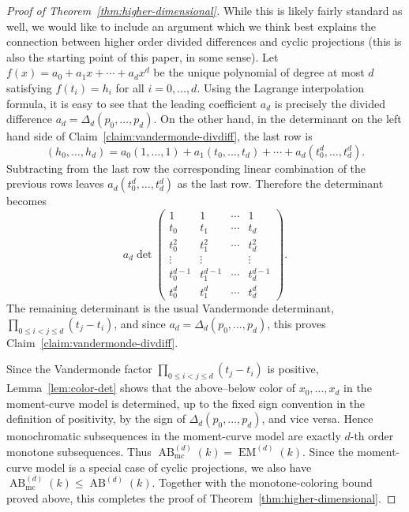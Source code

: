 \documentclass[10pt,a4paper]{amsart}
\begin{document}
\begin{proof}[Proof of Theorem~\ref{thm:higher-dimensional}]
While this is likely fairly standard as well, we would like to include an argument which we think best explains the connection between higher order divided differences and cyclic projections (this is also the starting point of this paper, in some sense). Let $f(x)=a_0+a_1x+\cdots+a_dx^d$ be the unique polynomial of degree at most $d$ satisfying $f(t_i)=h_i$ for all
$i=0,\dots,d$. Using the Lagrange interpolation formula, it is easy to see that
the leading coefficient $a_d$ is precisely the divided difference $a_d=\Delta_d(p_0,\dots,p_d)$. On the other hand, in the determinant on the left hand side of
Claim~\ref{claim:vandermonde-divdiff}, the last row is
\[
(h_0,\dots,h_d)
=
a_0(1,\dots,1)+a_1(t_0,\dots,t_d)+\cdots+a_d(t_0^d,\dots,t_d^d).
\]
Subtracting from the last row the corresponding linear combination of the
previous rows leaves $a_d(t_0^d,\dots,t_d^d)$ as the last row. Therefore the
determinant becomes
\[
a_d
\det
\begin{pmatrix}
1&1&\cdots&1\\
t_0&t_1&\cdots&t_d\\
t_0^2&t_1^2&\cdots&t_d^2\\
\vdots&\vdots&&\vdots\\
t_0^{d-1}&t_1^{d-1}&\cdots&t_d^{d-1}\\
t_0^d&t_1^d&\cdots&t_d^d
\end{pmatrix}.
\]
The remaining determinant is the usual Vandermonde determinant,
$\prod_{0\le i<j\le d}(t_j-t_i)$, and since
$a_d=\Delta_d(p_0,\dots,p_d)$, this proves Claim~\ref{claim:vandermonde-divdiff}.

Since the Vandermonde factor $\prod_{0\le i<j\le d}(t_j-t_i)$ is positive,
Lemma~\ref{lem:color-det} shows that the above--below color of
$x_0,\ldots,x_d$ in the moment-curve model is determined, up to the fixed sign
convention in the definition of positivity, by the sign of
$\Delta_d(p_0,\ldots,p_d)$, and vice versa. Hence monochromatic subsequences in
the moment-curve model are exactly $d$-th order monotone subsequences. Thus $\operatorname{AB}^{(d)}_{\mathrm{mc}}(k)=\operatorname{EM}^{(d)}(k)$. Since the moment-curve model is a special case of cyclic projections, we also
have $\operatorname{AB}^{(d)}_{\mathrm{mc}}(k)\le \operatorname{AB}^{(d)}(k)$. Together with the monotone-coloring bound proved above, this completes the proof of Theorem~\ref{thm:higher-dimensional}.
\end{proof}
\end{document}
